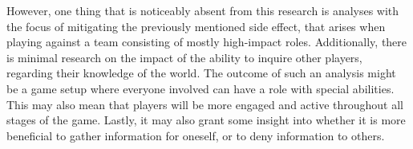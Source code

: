 However, one thing that is noticeably absent from this research is analyses
with the focus of mitigating the previously mentioned side effect, that arises
when playing against a team consisting of mostly high-impact roles.
Additionally, there is minimal research on the impact of the ability to inquire
other players, regarding their knowledge of the world. The outcome of such an
analysis might be a game setup where everyone involved can have a role with
special abilities. This may also mean that players will be more engaged and
active throughout all stages of the game. Lastly, it may also grant some
insight into whether it is more beneficial to gather information for oneself,
or to deny information to others.